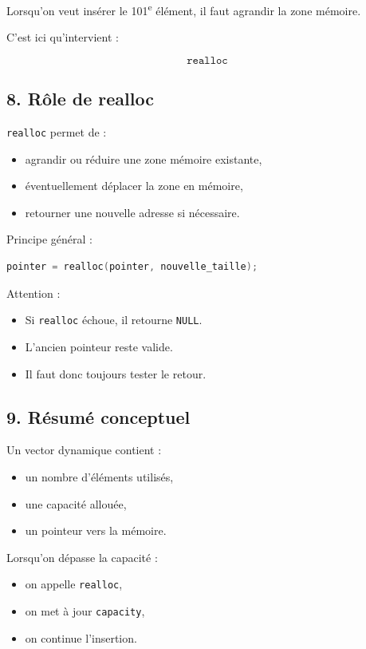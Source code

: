 Lorsqu’on veut insérer le 101\textsuperscript{e} élément,
il faut agrandir la zone mémoire.

C’est ici qu’intervient :

\[
\boxed{\texttt{realloc}}
\]

\subsection*{8. Rôle de realloc}

\texttt{realloc} permet de :

\begin{itemize}
    \item agrandir ou réduire une zone mémoire existante,
    \item éventuellement déplacer la zone en mémoire,
    \item retourner une nouvelle adresse si nécessaire.
\end{itemize}

Principe général :

\begin{lstlisting}[language=C]
pointer = realloc(pointer, nouvelle_taille);
\end{lstlisting}

Attention :

\begin{itemize}
    \item Si \texttt{realloc} échoue, il retourne \texttt{NULL}.
    \item L’ancien pointeur reste valide.
    \item Il faut donc toujours tester le retour.
\end{itemize}

\subsection*{9. Résumé conceptuel}

Un vector dynamique contient :

\begin{itemize}
    \item un nombre d’éléments utilisés,
    \item une capacité allouée,
    \item un pointeur vers la mémoire.
\end{itemize}

Lorsqu’on dépasse la capacité :

\begin{itemize}
    \item on appelle \texttt{realloc},
    \item on met à jour \texttt{capacity},
    \item on continue l’insertion.
\end{itemize}

